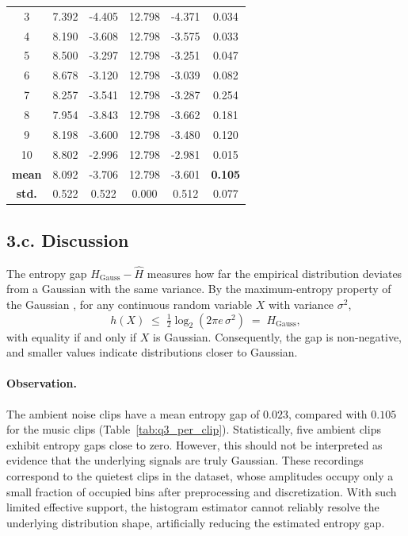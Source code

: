 \documentclass[a4paper,10pt]{article}
\theoremstyle{nonumberplain}
\theoremstyle{nonumberplain}
\theoremstyle{nonumberplain}
\theoremstyle{nonumberplain}
\begin{document}
\begin{table}[H]
{\begin{minipage}[t]{0.48\textwidth}
\begin{tabular}{c c c c c c}
            3 & 7.392 & -4.405 & 12.798 & -4.371 & 0.034 \\
            4 & 8.190 & -3.608 & 12.798 & -3.575 & 0.033 \\
            5 & 8.500 & -3.297 & 12.798 & -3.251 & 0.047 \\
            6 & 8.678 & -3.120 & 12.798 & -3.039 & 0.082 \\
            7 & 8.257 & -3.541 & 12.798 & -3.287 & 0.254 \\
            8 & 7.954 & -3.843 & 12.798 & -3.662 & 0.181 \\
            9 & 8.198 & -3.600 & 12.798 & -3.480 & 0.120 \\
            10 & 8.802 & -2.996 & 12.798 & -2.981 & 0.015 \\
            \hline
            \textbf{mean} & 8.092 & -3.706 & 12.798 & -3.601 & \textbf{0.105} \\
            \textbf{std.} & 0.522 & 0.522 & 0.000 & 0.512 & 0.077 \\
            \hline
        \end{tabular}
    \end{minipage}
    }
\end{table}

\subsection*{3.c. Discussion}

The entropy gap $H_{\text{Gauss}} - \widehat{H}$ measures how far the empirical
distribution deviates from a Gaussian with the same variance. By the
maximum-entropy property of the Gaussian \cite{cover2006}, for any continuous random variable $X$
with variance $\sigma^2$,
\[
  h(X) \;\leq\; \tfrac{1}{2}\log_2(2\pi e\,\sigma^2) \;=\; H_{\text{Gauss}},
\]
with equality if and only if $X$ is Gaussian. Consequently, the gap is non-negative, and smaller values indicate distributions closer to Gaussian.

\paragraph{Observation.}
The ambient noise clips have a mean entropy gap of $0.023$, compared with $0.105$ for the music clips (Table~\ref{tab:q3_per_clip}). Statistically, five ambient clips exhibit entropy gaps close to zero. However, this should not be interpreted as evidence that the underlying signals are truly Gaussian. These recordings correspond to the quietest clips in the dataset, whose amplitudes occupy only a small fraction of occupied bins after preprocessing and discretization. With such limited effective support, the histogram estimator cannot reliably resolve the underlying distribution shape, artificially reducing the estimated entropy gap.
\end{document}
